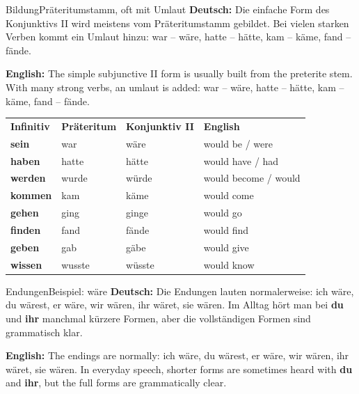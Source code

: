\documentclass[a4paper,11pt]{article}
\newcommand{\GermanText}[1]{\textbf{Deutsch: }#1\par}
\newcommand{\EnglishText}[1]{{\small\color{SoftGray}\textbf{English: }#1\par}}
\begin{document}
        \begin{grammarentry}{Bildung}{Präteritumstamm, oft mit Umlaut}
            \GermanText{Die einfache Form des Konjunktivs II wird meistens vom Präteritumstamm gebildet. Bei vielen starken Verben kommt ein Umlaut hinzu: war -- wäre, hatte -- hätte, kam -- käme, fand -- fände.}
            \EnglishText{The simple subjunctive II form is usually built from the preterite stem. With many strong verbs, an umlaut is added: war -- wäre, hatte -- hätte, kam -- käme, fand -- fände.}
        \end{grammarentry}

        \begin{longtable}{>{\bfseries}p{3cm}|p{3cm}|p{3.4cm}|p{4.2cm}}
            \rowcolor{HeaderBlueDark}
            \color{white}\textbf{Infinitiv} &
            \color{white}\textbf{Präteritum} &
            \color{white}\textbf{Konjunktiv II} &
            \color{white}\textbf{English} \\
            sein & war & wäre & would be / were \\
            haben & hatte & hätte & would have / had \\
            werden & wurde & würde & would become / would \\
            kommen & kam & käme & would come \\
            gehen & ging & ginge & would go \\
            finden & fand & fände & would find \\
            geben & gab & gäbe & would give \\
            wissen & wusste & wüsste & would know \\
        \end{longtable}

        \begin{grammarentry}{Endungen}{Beispiel: wäre}
            \GermanText{Die Endungen lauten normalerweise: ich wäre, du wärest, er wäre, wir wären, ihr wäret, sie wären. Im Alltag hört man bei \textbf{du} und \textbf{ihr} manchmal kürzere Formen, aber die vollständigen Formen sind grammatisch klar.}
            \EnglishText{The endings are normally: ich wäre, du wärest, er wäre, wir wären, ihr wäret, sie wären. In everyday speech, shorter forms are sometimes heard with \textbf{du} and \textbf{ihr}, but the full forms are grammatically clear.}
        \end{grammarentry}
\end{document}
